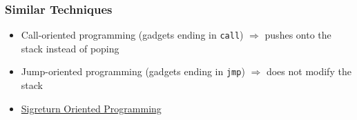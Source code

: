\documentclass[aspectratio=169]{beamer}
\begin{document}
\begin{frame}[fragile]
    \frametitle{Similar Techniques}
    \begin{itemize}
        \item Call-oriented programming (gadgets ending in
            \texttt{call}) $\Rightarrow$ pushes onto the stack instead
            of poping
        \item Jump-oriented programming (gadgets ending in
            \texttt{jmp}) $\Rightarrow$ does not modify the stack
        \item \href{https://en.wikipedia.org/wiki/Sigreturn-oriented_programming}{Sigreturn Oriented Programming}
    \end{itemize}
\end{frame}
\end{document}
